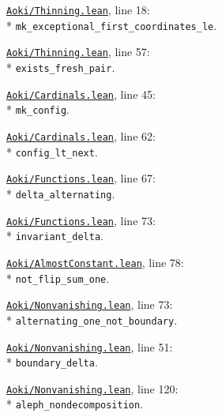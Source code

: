 \begin{leansources}
\item \href{../../../lean/Aoki/Thinning.lean}{\nolinkurl{Aoki/Thinning.lean}}, line 18:\\*
\nolinkurl{mk_exceptional_first_coordinates_le}.
\item \href{../../../lean/Aoki/Thinning.lean}{\nolinkurl{Aoki/Thinning.lean}}, line 57:\\*
\nolinkurl{exists_fresh_pair}.
\item \href{../../../lean/Aoki/Cardinals.lean}{\nolinkurl{Aoki/Cardinals.lean}}, line 45:\\*
\nolinkurl{mk_config}.
\item \href{../../../lean/Aoki/Cardinals.lean}{\nolinkurl{Aoki/Cardinals.lean}}, line 62:\\*
\nolinkurl{config_lt_next}.
\end{leansources}

\begin{leansources}
\item \href{../../../lean/Aoki/Functions.lean}{\nolinkurl{Aoki/Functions.lean}}, line 67:\\*
\nolinkurl{delta_alternating}.
\item \href{../../../lean/Aoki/Functions.lean}{\nolinkurl{Aoki/Functions.lean}}, line 73:\\*
\nolinkurl{invariant_delta}.
\item \href{../../../lean/Aoki/AlmostConstant.lean}{\nolinkurl{Aoki/AlmostConstant.lean}}, line 78:\\*
\nolinkurl{not_flip_sum_one}.
\item \href{../../../lean/Aoki/Nonvanishing.lean}{\nolinkurl{Aoki/Nonvanishing.lean}}, line 73:\\*
\nolinkurl{alternating_one_not_boundary}.
\item \href{../../../lean/Aoki/Nonvanishing.lean}{\nolinkurl{Aoki/Nonvanishing.lean}}, line 51:\\*
\nolinkurl{boundary_delta}.
\item \href{../../../lean/Aoki/Nonvanishing.lean}{\nolinkurl{Aoki/Nonvanishing.lean}}, line 120:\\*
\nolinkurl{aleph_nondecomposition}.
\end{leansources}

